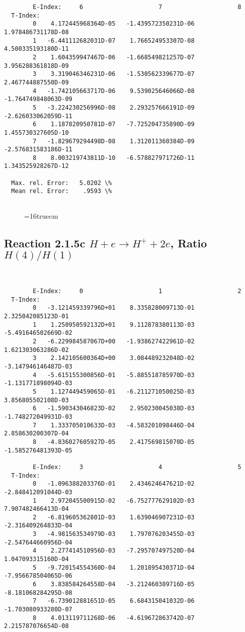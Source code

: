 \documentclass[12pt,dvipdfmx]{article}
\begin{document}
{\begin{small}
\begin{verbatim}
        E-Index:     6                     7                     8
  T-Index:
        0    4.172445968364D-05   -1.439572350231D-06    1.978486731178D-08
        1   -6.441112682031D-07    1.766524953307D-08    4.500335193180D-11
        2    1.604359947467D-06   -1.668549821257D-07    3.956288361818D-09
        3    3.319046346231D-06   -1.530562339677D-07    2.467744887550D-09
        4   -1.742105663717D-06    9.539025646066D-08   -1.764749848063D-09
        5   -3.224230256996D-08    2.293257666191D-09   -2.626033062059D-11
        6    1.187820950781D-07   -7.725204735890D-09    1.455730327605D-10
        7   -1.829679294498D-08    1.312011360384D-09   -2.576831583186D-11
        8    8.003219743811D-10   -6.578827971726D-11    1.343525928267D-12

  Max. rel. Error:   5.0202 \%
  Mean rel. Error:    .9593 \%


\end{verbatim}\end{small}
\begin{figure} \label{2.1.5b}
\epsfxsize=16truecm
\end{figure}

\newpage
\subsection{
Reaction 2.1.5c  $H + e \rightarrow H^+ + 2e$, Ratio $H(4)/H(1)$
}


\begin{small}\begin{verbatim}


        E-Index:     0                     1                     2
  T-Index:
        0   -3.121459339796D+01    8.335828009713D-01    2.325042085123D-01
        1    1.250950592132D+01    9.112878380113D-03   -5.491646502669D-02
        2   -6.229984587067D+00   -1.938627422961D-02    1.621303063286D-02
        3    2.142105600364D+00    3.084489232048D-02   -3.147946146487D-03
        4   -5.615155300856D-01   -5.885518785970D-03   -1.131771898094D-03
        5    1.127449459065D-01   -6.211271050025D-03    3.856805502108D-03
        6   -1.590343046823D-02    2.950230045038D-03   -1.748272049931D-03
        7    1.333705010633D-03   -4.583201098446D-04    2.858630200307D-04
        8   -4.836027605927D-05    2.417569815070D-05   -1.585276481393D-05

        E-Index:     3                     4                     5
  T-Index:
        0   -1.096388203376D-01    2.434624647621D-02   -2.848412091044D-03
        1    2.972045500915D-02   -6.752777629102D-03    7.907482466413D-04
        2   -6.819605362801D-03    1.639046907231D-03   -2.316409264833D-04
        3   -4.981563534979D-03    1.797076203455D-03   -2.547644660956D-04
        4    2.277414510956D-03   -7.295707497520D-04    1.047093315160D-04
        5   -9.720154554360D-04    1.201895430371D-04   -7.956678504065D-06
        6    3.838584264558D-04   -3.212460389716D-05   -8.181068284295D-08
        7   -6.739012881651D-05    6.684315041032D-06   -1.703080933280D-07
        8    4.013119711268D-06   -4.619672863742D-07    2.215787076654D-08


\end{verbatim}
\end{small}}
\end{document}
